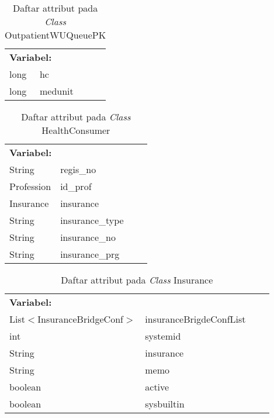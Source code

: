 \begin{table}[H]
	\caption{Daftar attribut pada \textit{Class} OutpatientWUQueuePK}
	\centering
	\small
	\begin{adjustbox}{width=1\textwidth}	
		\begin{tabular}{|p{4cm} p{2.1cm} p{3cm} p{3.1cm}|}
			\hline
			\multicolumn{2}{|l}{\textbf{Variabel:}}&\multicolumn{2}{l|}{\textbf{}}\\
			long&hc&&\\
			long&medunit&&\\
			\hline
		\end{tabular}
	\end{adjustbox}
\end{table}
\begin{table}[H]
	\caption{Daftar attribut pada \textit{Class} HealthConsumer}
	\centering
	\small
	\begin{adjustbox}{width=1\textwidth}	
		\begin{tabular}{|p{4cm} p{2.1cm} p{3cm} p{3.1cm}|}
			\hline
			\multicolumn{2}{|l}{\textbf{Variabel:}}&\multicolumn{2}{l|}{\textbf{}}\\
			String&regis\_no&&\\
			Profession&id\_prof&&\\
			Insurance&insurance&&\\
			String&insurance\_type&&\\
			String&insurance\_no&&\\
			String&insurance\_prg&&\\
			\hline
		\end{tabular}
	\end{adjustbox}
\end{table}
\begin{table}[H]
	\caption{Daftar attribut pada \textit{Class} Insurance}
	\centering
	\small
	\begin{adjustbox}{width=1\textwidth}	
		\begin{tabular}{|p{5cm} p{3.1cm} p{2cm} p{2.1cm}|}
			\hline
			\multicolumn{2}{|l}{\textbf{Variabel:}}&\multicolumn{2}{l|}{\textbf{}}\\
			List$<$InsuranceBridgeConf$>$&insuranceBrigdeConfList&&\\
			int&systemid&&\\
			String&insurance&&\\
			String&memo&&\\
			boolean&active&&\\
			boolean&sysbuiltin&&\\
			\hline
		\end{tabular}
	\end{adjustbox}
\end{table}
